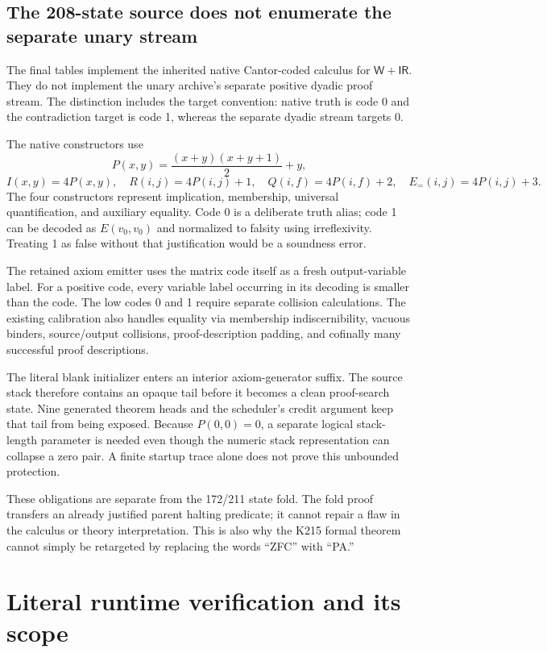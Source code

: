 \documentclass[11pt,a4paper]{article}
\theoremstyle{definition}
\newcommand{\W}{\mathsf{W}}
\newcommand{\IR}{\mathsf{IR}}
\begin{document}
\subsection{The 208-state source does not enumerate the separate unary stream}

The final tables implement the inherited native Cantor-coded calculus for $\W+\IR$. They do not implement the unary archive's separate positive dyadic proof stream. The distinction includes the target convention: native truth is code 0 and the contradiction target is code 1, whereas the separate dyadic stream targets 0.

The native constructors use
\[
P(x,y)=\frac{(x+y)(x+y+1)}2+y,
\]
\[
I(x,y)=4P(x,y),\quad R(i,j)=4P(i,j)+1,\quad
Q(i,f)=4P(i,f)+2,\quad E_{=}(i,j)=4P(i,j)+3.
\]
The four constructors represent implication, membership, universal quantification, and auxiliary equality. Code 0 is a deliberate truth alias; code 1 can be decoded as $E(v_0,v_0)$ and normalized to falsity using irreflexivity. Treating 1 as false without that justification would be a soundness error.

The retained axiom emitter uses the matrix code itself as a fresh output-variable label. For a positive code, every variable label occurring in its decoding is smaller than the code. The low codes 0 and 1 require separate collision calculations. The existing calibration also handles equality via membership indiscernibility, vacuous binders, source/output collisions, proof-description padding, and cofinally many successful proof descriptions.

The literal blank initializer enters an interior axiom-generator suffix. The source stack therefore contains an opaque tail before it becomes a clean proof-search state. Nine generated theorem heads and the scheduler's credit argument keep that tail from being exposed. Because $P(0,0)=0$, a separate logical stack-length parameter is needed even though the numeric stack representation can collapse a zero pair. A finite startup trace alone does not prove this unbounded protection.

These obligations are separate from the 172/211 state fold. The fold proof transfers an already justified parent halting predicate; it cannot repair a flaw in the calculus or theory interpretation. This is also why the K215 formal theorem cannot simply be retargeted by replacing the words ``ZFC'' with ``PA.''

\section{Literal runtime verification and its scope}
\label{sec:verification}
\end{document}
